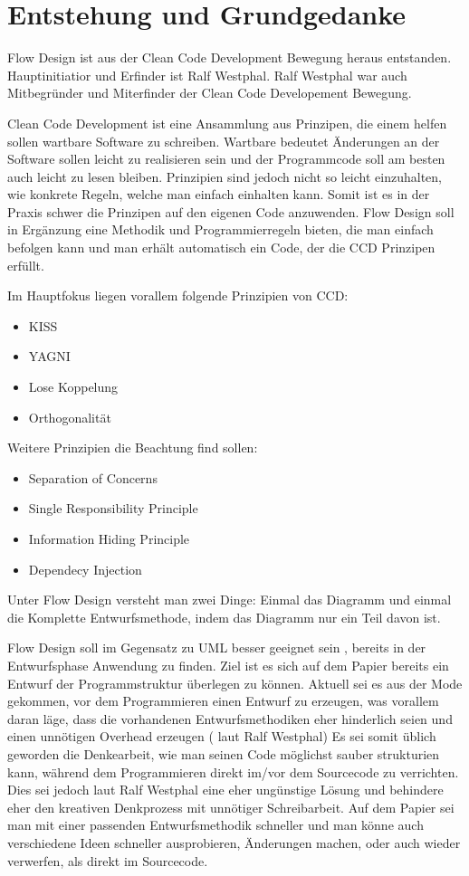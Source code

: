\documentclass[11pt]{article}
\date{\today}
\title{}
\begin{document}
\tableofcontents

\section{Entstehung und Grundgedanke}
\label{sec:orgheadline1}
Flow Design ist aus der Clean Code Development Bewegung heraus entstanden. Hauptinitiatior und Erfinder ist Ralf Westphal.
Ralf Westphal war auch Mitbegründer und Miterfinder der Clean Code Developement Bewegung.


Clean Code Development ist eine Ansammlung aus Prinzipen, die einem helfen sollen wartbare Software zu schreiben.
Wartbare bedeutet Änderungen an der Software sollen leicht zu realisieren sein und der Programmcode soll
am besten auch leicht zu lesen bleiben.
Prinzipien sind jedoch nicht so leicht einzuhalten, wie konkrete Regeln, welche man einfach einhalten kann.
Somit ist es in der Praxis schwer die Prinzipen auf den eigenen Code anzuwenden.
Flow Design soll in Ergänzung eine Methodik und Programmierregeln bieten, die man einfach befolgen kann und man erhält automatisch
ein Code, der die CCD Prinzipen erfüllt.

Im Hauptfokus liegen vorallem folgende Prinzipien von CCD:
\begin{itemize}
\item KISS
\item YAGNI
\item Lose Koppelung
\item Orthogonalität
\end{itemize}

Weitere Prinzipien die Beachtung find sollen:
\begin{itemize}
\item Separation of Concerns
\item Single Responsibility Principle
\item Information Hiding Principle
\item Dependecy Injection
\end{itemize}

Unter Flow Design versteht man zwei Dinge:
Einmal das Diagramm und einmal die Komplette Entwurfsmethode, indem das
Diagramm nur ein Teil davon ist.

Flow Design soll im Gegensatz zu UML besser geeignet sein , bereits in der Entwurfsphase Anwendung zu finden.
Ziel ist es sich auf dem Papier bereits ein Entwurf der Programmstruktur überlegen zu können.
Aktuell sei es aus der Mode gekommen, vor dem Programmieren einen Entwurf zu erzeugen, was vorallem daran läge, dass die vorhandenen
Entwurfsmethodiken eher hinderlich seien und einen unnötigen Overhead erzeugen ( laut Ralf Westphal)
Es sei somit üblich geworden die Denkearbeit, wie man seinen Code möglichst sauber strukturien kann,
während dem Programmieren direkt im/vor dem Sourcecode zu verrichten.
Dies sei jedoch laut Ralf Westphal eine eher ungünstige Lösung und behindere eher den kreativen Denkprozess mit
unnötiger Schreibarbeit.
Auf dem Papier sei man mit einer passenden Entwurfsmethodik schneller und man könne auch verschiedene Ideen schneller
ausprobieren, Änderungen machen, oder auch wieder verwerfen, als direkt im Sourcecode.
\end{document}
